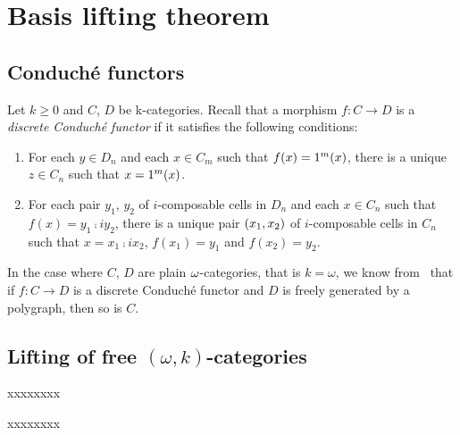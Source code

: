 \section{Basis lifting theorem}\label{sec:basislift}

\subsection{Conduché functors}\label{subsec:conduche}
\begin{paragr}
  Let $k\geq 0$ and $C$, $D$ be \ook k-categories. Recall that a morphism $f:C\to D$ is a {\em discrete Conduché functor} if it satisfies the following conditions:
  \begin{enumerate}
  \item For each $y\in D_n$ and each $x\in C_m$ such that $f(x)=1^{m}(x)$, there is a unique $z\in C_n$ such that $x=1^{m}(x)$.
    \item For each pair $y_1$, $y_2$ of $i$-composable cells in $D_n$ and each $x\in C_n$ such that $f(x)=y_1\comp i y_2$, there is a unique pair $(x_1,x_2)$ of $i$-composable cells in $C_n$ such that $x=x_1\comp i x_2$, $f(x_1)=y_1$ and $f(x_2)=y_2$.
    \end{enumerate}
    In the case where $C$, $D$ are plain $\omega$-categories, that is $k=\omega$, we know from~\cite[Theorem 6.11]{guetta:poldcf} that if $f:C\to D$ is a discrete Conduché functor and $D$ is freely generated by a polygraph, then so is $C$. 
  \end{paragr}




\subsection{Lifting of free $(\omega,k)$-categories}\label{subsec:lifting}
\begin{paragr}
  xxxxxxxx
\end{paragr}
\begin{theorem}
  xxxxxxxx
\end{theorem}
